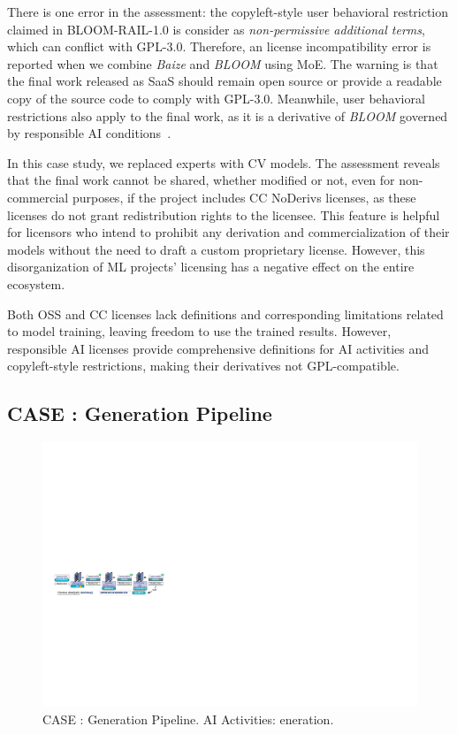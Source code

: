 There is one error in the assessment: the copyleft-style user behavioral restriction claimed in BLOOM-RAIL-1.0 is consider as \textit{non-permissive additional terms}, which can conflict with GPL-3.0.
Therefore, an license incompatibility error is reported when we combine \textit{Baize} and \textit{BLOOM} using MoE.
The warning is that the final work released as SaaS should remain open source or provide a readable copy of the source code to comply with GPL-3.0. 
Meanwhile, user behavioral restrictions also apply to the final work, as it is a derivative of \textit{BLOOM} governed by responsible AI conditions~\cite{contractor2022behavioral}.

In this case study, we replaced experts with CV models. 
The assessment reveals that the final work cannot be shared, whether modified or not, even for non-commercial purposes, if the project includes CC NoDerivs licenses, as these licenses do not grant redistribution rights to the licensee.
This feature is helpful for licensors who intend to prohibit any derivation and commercialization of their models without the need to draft a custom proprietary license.
However, this disorganization of ML projects' licensing has a negative effect on the entire ecosystem.

Both OSS and CC licenses lack definitions and corresponding limitations related to model training, leaving freedom to use the trained results. 
However, responsible AI licenses provide comprehensive definitions for AI activities and copyleft-style restrictions, making their derivatives not GPL-compatible.

\subsection{CASE  : Generation Pipeline}

\begin{figure}[h]
    \centering
    \includegraphics[width=\linewidth]{fig/case3.pdf}
    \caption{CASE : Generation Pipeline. AI Activities: eneration.}
    \Description{}
    \label{fig:case3}
\end{figure}


